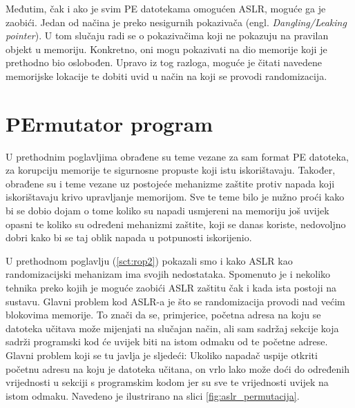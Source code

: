 \documentclass[times, utf8, diplomski, numeric]{fer}
\begin{document}
Međutim, čak i ako je svim PE datotekama omogućen ASLR, moguće ga je zaobići. Jedan od načina je preko nesigurnih pokazivača (engl. \emph{Dangling/Leaking pointer}). U tom slučaju radi se o pokazivačima koji ne pokazuju na pravilan objekt u memoriju. Konkretno, oni mogu pokazivati na dio memorije koji je prethodno bio oslobođen. Upravo iz tog razloga, moguće je čitati navedene memorijske lokacije te dobiti uvid u način na koji se provodi randomizacija.


\chapter{PErmutator program}
\label{sct:permutator}

U prethodnim poglavljima obrađene su teme vezane za sam format PE
datoteka, za korupciju memorije te sigurnosne propuste koji istu
iskorištavaju. Također, obrađene su i teme vezane uz postojeće
mehanizme zaštite protiv napada koji iskorištavaju krivo upravljanje  memorijom. 
Sve te			%
teme bilo je nužno proći kako bi se dobio dojam o tome koliko su
napadi usmjereni na memoriju još uvijek opasni te koliko su
određeni mehanizmi zaštite, koji se danas koriste, nedovoljno
dobri kako bi se taj oblik napada u potpunosti iskorijenio.			%

U prethodnom poglavlju (\ref{sct:rop2}) pokazali smo i kako ASLR			%
kao randomizacijski mehanizam ima svojih nedostataka. Spomenuto
je i nekoliko tehnika preko kojih je moguće zaobići ASLR zaštitu
čak i kada ista postoji na sustavu. Glavni problem kod ASLR-a je
što se randomizacija provodi nad većim blokovima memorije. To
znači da se, primjerice, početna adresa na koju se datoteka
učitava može mijenjati na slučajan način, ali sam sadržaj sekcije
koja sadrži programski kod će uvijek biti na istom odmaku od te
početne adrese. Glavni problem koji se tu javlja je sljedeći:
Ukoliko napadač uspije otkriti početnu adresu na koju je datoteka
učitana, on vrlo lako može doći do određenih vrijednosti u
sekciji s programskim kodom jer su sve te vrijednosti uvijek na
istom odmaku. Navedeno je ilustrirano na slici 
\ref{fig:aslr_permutacija}.
\end{document}
